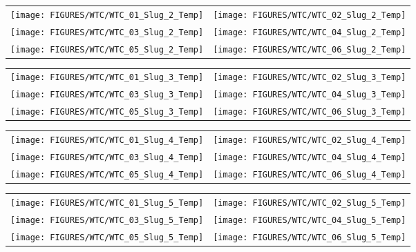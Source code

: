 \begin{figure}[p]
\begin{tabular*}{\textwidth}{l@{\extracolsep{\fill}}r}
\texttt{[image: FIGURES/WTC/WTC\_01\_Slug\_2\_Temp]} &
\texttt{[image: FIGURES/WTC/WTC\_02\_Slug\_2\_Temp]} \\
\texttt{[image: FIGURES/WTC/WTC\_03\_Slug\_2\_Temp]} &
\texttt{[image: FIGURES/WTC/WTC\_04\_Slug\_2\_Temp]} \\
\texttt{[image: FIGURES/WTC/WTC\_05\_Slug\_2\_Temp]} &
\texttt{[image: FIGURES/WTC/WTC\_06\_Slug\_2\_Temp]}
\end{tabular*}
\label{NIST_WTC_Slug_2_Temp}
\end{figure}

\begin{figure}[p]
\begin{tabular*}{\textwidth}{l@{\extracolsep{\fill}}r}
\texttt{[image: FIGURES/WTC/WTC\_01\_Slug\_3\_Temp]} &
\texttt{[image: FIGURES/WTC/WTC\_02\_Slug\_3\_Temp]} \\
\texttt{[image: FIGURES/WTC/WTC\_03\_Slug\_3\_Temp]} &
\texttt{[image: FIGURES/WTC/WTC\_04\_Slug\_3\_Temp]} \\
\texttt{[image: FIGURES/WTC/WTC\_05\_Slug\_3\_Temp]} &
\texttt{[image: FIGURES/WTC/WTC\_06\_Slug\_3\_Temp]}
\end{tabular*}
\label{NIST_WTC_Slug_3_Temp}
\end{figure}

\begin{figure}[p]
\begin{tabular*}{\textwidth}{l@{\extracolsep{\fill}}r}
\texttt{[image: FIGURES/WTC/WTC\_01\_Slug\_4\_Temp]} &
\texttt{[image: FIGURES/WTC/WTC\_02\_Slug\_4\_Temp]} \\
\texttt{[image: FIGURES/WTC/WTC\_03\_Slug\_4\_Temp]} &
\texttt{[image: FIGURES/WTC/WTC\_04\_Slug\_4\_Temp]} \\
\texttt{[image: FIGURES/WTC/WTC\_05\_Slug\_4\_Temp]} &
\texttt{[image: FIGURES/WTC/WTC\_06\_Slug\_4\_Temp]}
\end{tabular*}
\label{NIST_WTC_Slug_4_Temp}
\end{figure}

\begin{figure}[p]
\begin{tabular*}{\textwidth}{l@{\extracolsep{\fill}}r}
\texttt{[image: FIGURES/WTC/WTC\_01\_Slug\_5\_Temp]} &
\texttt{[image: FIGURES/WTC/WTC\_02\_Slug\_5\_Temp]} \\
\texttt{[image: FIGURES/WTC/WTC\_03\_Slug\_5\_Temp]} &
\texttt{[image: FIGURES/WTC/WTC\_04\_Slug\_5\_Temp]} \\
\texttt{[image: FIGURES/WTC/WTC\_05\_Slug\_5\_Temp]} &
\texttt{[image: FIGURES/WTC/WTC\_06\_Slug\_5\_Temp]}
\end{tabular*}
\label{NIST_WTC_Slug_5_Temp}
\end{figure}

